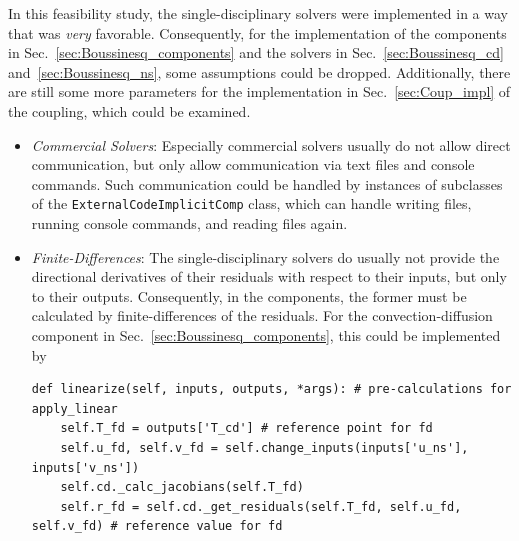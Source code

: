 \documentclass[10pt, ngerman, english,
twoside, open=right,
numbers=noenddot,
declaration=section,
abstract=section,
abstract=multiple,
abstract=notoc,
declaration=notoc,
cd=pale, 
chapterprefix=off, 
chapterpage=false, 
headingsvskip=-10em,
cdgeometry=custom, 
slantedgreek=on,
cdmath=on, 
cdfont=on,
ttfont=false,
mathswap=off,
]{tudscrreprt}
\numberwithin{equation}{chapter}
\newcommand{\sidenote}[1]{
  \leavevmode %
  \marginpar{\hyphenpenalty=1000 \flushleft{\textcolor{HKS41}{#1}}}}
\begin{document}
\sidenote{Implementation}In this feasibility study, the single-disciplinary solvers were implemented in a way that was \emph{very} favorable. Consequently, for the implementation of the components in Sec.~\ref{sec:Boussinesq_components} and the solvers in Sec.~\ref{sec:Boussinesq_cd} and~\ref{sec:Boussinesq_ns}, some assumptions could be dropped. Additionally, there are still some more parameters for the implementation in Sec.~\ref{sec:Coup_impl} of the coupling, which could be examined.
\begin{itemize}
\item \textit{Commercial Solvers}: Especially commercial solvers usually do not allow direct communication, but only allow communication via text files and console commands. Such communication could be handled by instances of subclasses of the \texttt{ExternalCodeImplicitComp} class, which can handle writing files, running console commands, and reading files again.
\item \textit{Finite-Differences}: The single-disciplinary solvers do usually not provide the directional derivatives of their residuals with respect to their inputs, but only to their outputs. Consequently, in the components, the former must be calculated by finite-differences of the residuals. For the convection-diffusion component in Sec.~\ref{sec:Boussinesq_components}, this could be implemented by
\begin{lstlisting}[firstnumber=27]
def linearize(self, inputs, outputs, *args): # pre-calculations for apply_linear
	self.T_fd = outputs['T_cd'] # reference point for fd
	self.u_fd, self.v_fd = self.change_inputs(inputs['u_ns'], inputs['v_ns'])
	self.cd._calc_jacobians(self.T_fd)
    self.r_fd = self.cd._get_residuals(self.T_fd, self.u_fd, self.v_fd) # reference value for fd
    

\end{lstlisting}
\end{itemize}
\end{document}
